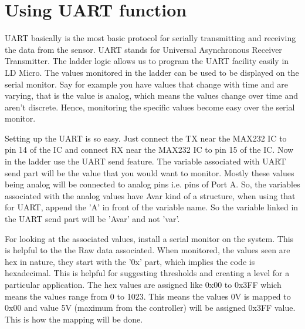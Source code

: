 \documentclass[12pt]{article}
\begin{document}
\vspace{12pt}
\cleardoublepage
{\Large \section{Using UART function}}
UART basically is the most basic protocol for serially transmitting and receiving the data from the sensor. UART stands for Universal Asynchronous Receiver Transmitter.  The ladder logic allows us to program the UART facility easily in LD Micro. The values monitored in the ladder can be used to be displayed on the serial monitor. Say for example you have values that change with time and are varying, that is the value is analog, which means the values change over time and aren't discrete. Hence, monitoring the specific values become easy over the serial monitor. \vspace{12pt}

Setting up the UART is so easy. Just connect the TX near the MAX232 IC to pin 14 of the IC and connect RX near the MAX232 IC to pin 15 of the IC. Now in the ladder use the UART send feature. The variable associated with UART send part will be the value that you would want to monitor. Mostly these values being analog will be connected to analog pins i.e. pins of Port A. So, the variables associated with the analog values have Avar kind of a structure, when using that for UART, append the 'A' in front of the variable name. So the variable linked in the UART send part will be 'Avar' and not 'var'.\vspace{12pt} 

For looking at the associated values, install a serial monitor on the system. This is helpful to the the Raw data associated. When monitored, the values seen are hex in nature, they start with the '0x' part, which implies the code is hexadecimal. This is helpful for suggesting thresholds and creating a level for a particular application. The hex values are assigned like 0x00 to 0x3FF which means the values range from 0 to 1023. This means the values 0V is mapped to 0x00 and value 5V (maximum from the controller) will be assigned 0x3FF value. This is how the mapping will be done. 
\newpage
\end{document}
